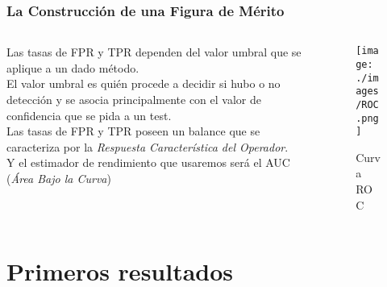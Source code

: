 \documentclass[10pt]{beamer}
\begin{document}
\begin{frame} \frametitle{La Construcci\'on de una Figura de M\'erito}
 \begin{columns}[T]
\begin{column}{0.48\textwidth}
 Las tasas de FPR y TPR dependen del valor umbral que se aplique a un dado m\'etodo.\\ 
 El valor umbral es qui\'en procede a decidir si hubo o no detecci\'on y se asocia principalmente
 con el valor de confidencia que se pida a un test.\\ 
 Las tasas de FPR y TPR poseen un balance que se caracteriza por la \textit{Respuesta Caracter\'{i}stica del Operador}.\\ 
 Y el estimador de rendimiento que usaremos ser\'a el AUC (\textit{\'Area Bajo la Curva})
 \end{column}
 \begin{column}{0.55\textwidth}
 \begin{figure}
 \centering
 \texttt{[image: ./images/ROC.png]}
 \caption{\scriptsize{Curva ROC}}
\end{figure}\pause
\end{column}
 \end{columns}
\end{frame}
\section{Primeros resultados}
\frame{
\tableofcontents[ 
    currentsection, 
    sectionstyle=show/hide, 
    sectionstyle=show/shaded, 
    ]}
\end{document}
